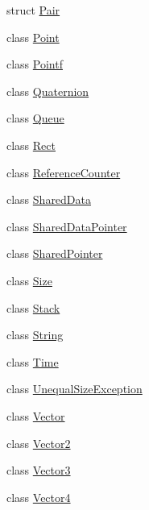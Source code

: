 \begin{DoxyCompactItemize}
\item 
struct \hyperlink{structprism_1_1_pair}{Pair}
\item 
class \hyperlink{classprism_1_1_point}{Point}
\item 
class \hyperlink{classprism_1_1_pointf}{Pointf}
\item 
class \hyperlink{classprism_1_1_quaternion}{Quaternion}
\item 
class \hyperlink{classprism_1_1_queue}{Queue}
\item 
class \hyperlink{classprism_1_1_rect}{Rect}
\item 
class \hyperlink{classprism_1_1_reference_counter}{Reference\+Counter}
\item 
class \hyperlink{classprism_1_1_shared_data}{Shared\+Data}
\item 
class \hyperlink{classprism_1_1_shared_data_pointer}{Shared\+Data\+Pointer}
\item 
class \hyperlink{classprism_1_1_shared_pointer}{Shared\+Pointer}
\item 
class \hyperlink{classprism_1_1_size}{Size}
\item 
class \hyperlink{classprism_1_1_stack}{Stack}
\item 
class \hyperlink{classprism_1_1_string}{String}
\item 
class \hyperlink{classprism_1_1_time}{Time}
\item 
class \hyperlink{classprism_1_1_unequal_size_exception}{Unequal\+Size\+Exception}
\item 
class \hyperlink{classprism_1_1_vector}{Vector}
\item 
class \hyperlink{classprism_1_1_vector2}{Vector2}
\item 
class \hyperlink{classprism_1_1_vector3}{Vector3}
\item 
class \hyperlink{classprism_1_1_vector4}{Vector4}
\end{DoxyCompactItemize}

